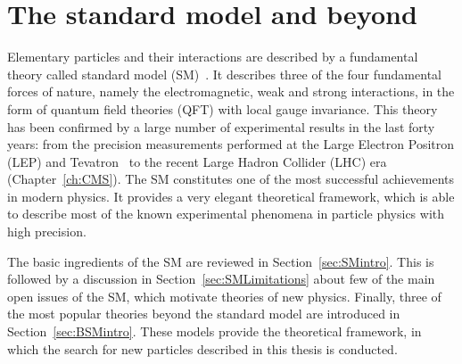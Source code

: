 \chapter{The standard model and beyond}
\label{ch:theory}

Elementary particles and their interactions are described by a fundamental theory called standard model (SM)~\cite{QFTbook}.
It describes three of the four fundamental forces of nature, namely the electromagnetic, weak and strong interactions, in the form of quantum field theories (QFT) with local gauge invariance.
This theory has been confirmed by a large number of experimental results in the last forty years: from the precision measurements performed at the Large Electron Positron (LEP) and Tevatron~\cite{ALEPH:2010aa}
to the recent Large Hadron Collider (LHC) era (Chapter~\ref{ch:CMS}).
The SM constitutes one of the most successful achievements in modern physics.
It provides a very elegant theoretical framework, which is able to describe most of the known experimental phenomena in particle physics with high precision.

The basic ingredients of the SM are reviewed in Section~\ref{sec:SMintro}. This is followed by a discussion in Section~\ref{sec:SMLimitations} about few of the main open issues of the SM, which motivate theories of new physics.
Finally, three of the most popular theories beyond the standard model are introduced in Section~\ref{sec:BSMintro}. These models provide the theoretical framework, in which the search for new particles described in this thesis is conducted.

  

  
  
  
  
